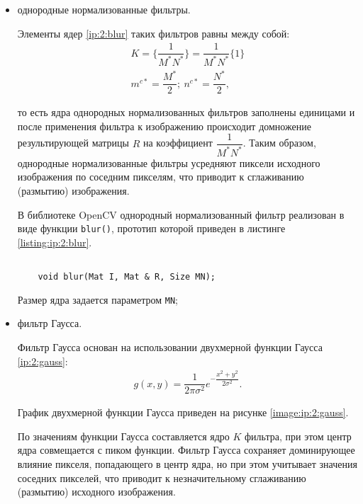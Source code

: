 \begin{itemize}

	\item однородные нормализованные фильтры.

	Элементы ядер \eqref{ip:2:blur} таких фильтров равны между собой:
	\begin{gather}
		\label{ip:2:blur}
		K = \{ \dfrac{1}{M^*N^*} \} = \dfrac{1}{M^*N^*} \{ 1 \}\\
		m^{c*} = \dfrac{M^*}{2} ;~ n^{c*} = \dfrac{N^*}{2},
	\end{gather}

	то есть ядра однородных нормализованных фильтров заполнены единицами и после применения фильтра к изображению происходит домножение результирующей матрицы $R$ на коэффициент $\dfrac{1}{M^*N^*}$. Таким образом, однородные нормализованные фильтры усредняют пиксели исходного изображения по соседним пикселям, что приводит к сглаживанию (размытию) изображения.

	В библиотеке OpenCV однородный нормализованный фильтр реализован в виде функции \verb|blur()|, прототип которой приведен в листинге \ref{listing:ip:2:blur}.

	\begin{lstlisting}

	void blur(Mat I, Mat & R, Size MN);

	\end{lstlisting}
	\mylistingend

	Размер ядра задается параметром \verb|MN|;

	\item фильтр Гаусса.

	Фильтр Гаусса основан на использовании двухмерной функции Гаусса \eqref{ip:2:gauss}:
	\begin{gather}
		\label{ip:2:gauss}
		g(x, y) = \dfrac{1}{2 \pi \sigma^2}e^{-\dfrac{x ^ 2 + y ^ 2}{2 \sigma ^ 2}}.
	\end{gather}

	График двухмерной функции Гаусса приведен на рисунке \ref{image:ip:2:gauss}.

	По значениям функции Гаусса составляется ядро $K$ фильтра, при этом центр ядра совмещается с пиком функции. Фильтр Гаусса сохраняет доминирующее влияние пикселя, попадающего в центр ядра, но при этом учитывает значения соседних пикселей, что приводит к незначительному сглаживанию (размытию) исходного изображения.


\end{itemize}
